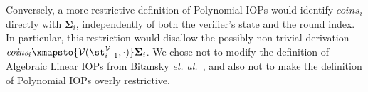 Conversely, a more restrictive definition of Polynomial IOPs would identify $\textit{coins}_i$ directly with $\boldsymbol{\Sigma}_i$, independently of both the verifier's state and the round index. In particular, this restriction would disallow the possibly non-trivial derivation $\textit{coins}_i \xmapsto{\verifier(\st^\verifier_{i-1}, \cdot)} \boldsymbol{\Sigma}_i$. We chose not to modify the definition of Algebraic Linear IOPs from Bitansky \emph{et. al.}~\cite{TCC:BCIOP13}, and also not to make the definition of Polynomial IOPs overly restrictive.


\begin{comment} 
\begin{definition}[Polynomial IOP] 
Let $\mathcal{R}$ be a binary relation and $\FF$ a finite field. Let $\mathbf{X} = (X_1, \ldots, X_\mu)$ be a vector of $\mu$. A $(\mu, d)$ Polynomial IOP for $\mathcal{R}$ over $\FF$ with soundness error $\epsilon$ and knowledge error $\delta$ consists of two stateful PPT algorithms, the \emph{prover} $\prover$, and the \emph{verifier} $\verifier$, that satisfy the following requirements:\\

\noindent \underline{Protocol syntax}. 
For each $i$th round there is a prover state $\textsf{st}^\prover_i$ and a verifier state $\textsf{st}^\verifier_i$. For any common input $x$ and $\mathcal{R}$ witness $w$, at round 0 the states are $\textsf{st}^\prover_0 = (x, w)$ and $\textsf{st}^\verifier_0 = x$. 
In the $i$th round (starting at $i = 1$) the prover outputs a single proof oracle $\prover(\textsf{st}^\prover_{i-1}) \rightarrow \pi_i$, which is a polynomial $\pi_i(\mathbf{X}) \in \mathbb{F}[\mathbf{X}]$. 
The verifier computes a list of points $\verifier(\st^\verifier_{i-1}) \rightarrow \boldsymbol{\Sigma}_i$ where $\boldsymbol{\Sigma}_i = (\boldsymbol{\sigma}_{i,1}, \ldots, \boldsymbol{\sigma}_{i, \ell}) \in \mathbb{F}^{\mu \times \ell}$.  
The verifier queries the oracle $\pi_i$ on all points in the list, 
and obtains the response vector: 
$(\pi_i(\boldsymbol{\sigma}_{i,1}), \ldots, \pi_\ell(\boldsymbol{\sigma}_{i, \ell})) = \mathbf{a}_i \in \mathbb{F}^{1 \times \ell}$. The updated prover state is $\textsf{st}^\prover_i \leftarrow (\textsf{st}^\prover_{i-1}, \boldsymbol{\Sigma}_i)$
and verifier state is $\textsf{st}^\verifier_i \leftarrow (\textsf{st}^\verifier_{i-1}, \boldsymbol{\Sigma}_i, \mathbf{a}_i)$. Finally, $\verifier(\textsf{st}^\verifier_t)$ returns $1$ or $0$. 


\end{comment}
